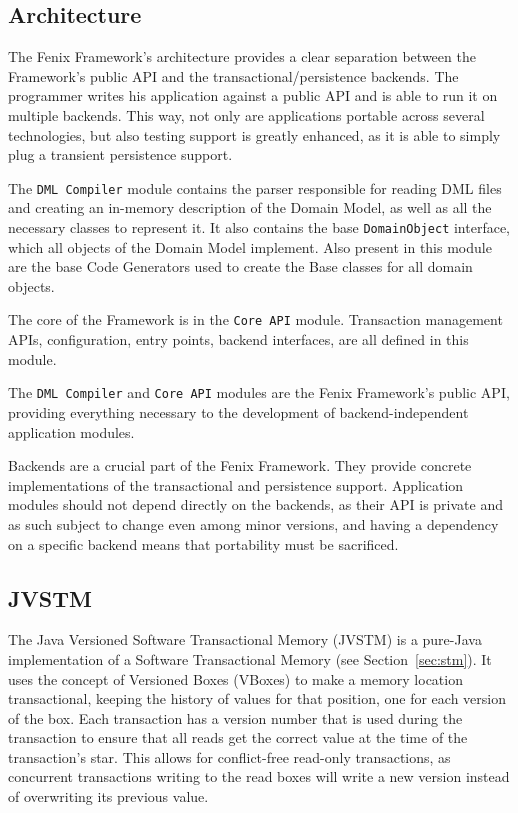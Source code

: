 \documentclass{llncs}
\begin{document}
\subsection{Architecture}
\label{sec:ff-arch}

The Fenix Framework's architecture provides a clear separation between
the Framework's public API and the transactional/persistence
backends. The programmer writes his application against a public API
and is able to run it on multiple backends. This way, not only are
applications portable across several technologies, but also testing
support is greatly enhanced, as it is able to simply plug a transient
persistence support.

The \texttt{DML Compiler} module contains the parser responsible for reading
DML files and creating an in-memory description of the Domain Model,
as well as all the necessary classes to represent it. It also contains
the base \texttt{DomainObject} interface, which all objects of the Domain
Model implement. Also present in this module are the base Code
Generators used to create the Base classes for all domain
objects.

The core of the Framework is in the \texttt{Core API} module. Transaction
management APIs, configuration, entry points, backend interfaces, are
all defined in this module.

The \texttt{DML Compiler} and \texttt{Core API} modules are the Fenix
Framework's public API, providing everything necessary to the
development of backend-independent application modules.

Backends are a crucial part of the Fenix Framework. They provide
concrete implementations of the transactional and persistence
support. Application modules should not depend directly on the
backends, as their API is private and as such subject to change even
among minor versions, and having a dependency on a specific backend
means that portability must be sacrificed.

\subsection{JVSTM}
\label{sec:jvstm}

The Java Versioned Software Transactional Memory (JVSTM)
\cite{cachopo2006versioned} is a pure-Java implementation of a
Software Transactional Memory (see Section~\ref{sec:stm}).  It uses
the concept of Versioned Boxes (VBoxes) to make a memory location
transactional, keeping the history of values for that position, one
for each version of the box. Each transaction has a version number
that is used during the transaction to ensure that all reads get the
correct value at the time of the transaction's star. This allows for
conflict-free read-only transactions, as concurrent transactions
writing to the read boxes will write a new version instead of
overwriting its previous value.
\end{document}
